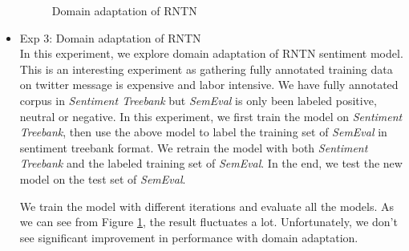 \begin{itemize}
\begin{figure}[htbp]
\centering
    \hspace{0.01cm}
    \caption{Domain adaptation of RNTN\label{domain}} 
\end{figure}

\item Exp 3: Domain adaptation of RNTN\\
In this experiment, we explore domain adaptation of RNTN sentiment model. This is an interesting experiment as gathering fully annotated training data on twitter message is expensive and labor intensive. We have fully annotated corpus in \textit{Sentiment Treebank} but \textit{SemEval} is only been labeled positive, neutral or negative. In this experiment, we first train the model on \textit{Sentiment Treebank}, then use the above model to label the training set of \textit{SemEval} in sentiment treebank format. We retrain the model with both \textit{Sentiment Treebank} and the labeled  training set of \textit{SemEval}. In the end, we test the new model on the test set of \textit{SemEval}.





%

We train the model with different iterations and evaluate all the models. As we can see from Figure \ref{domain}, the result fluctuates a lot. Unfortunately, we don't see significant improvement in performance with domain adaptation.  
\end{itemize}


